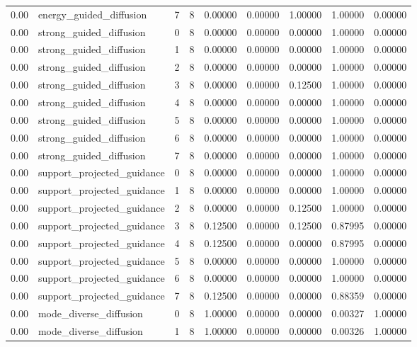 \documentclass{article}
\begin{document}
\begin{table}[tbp]
{\begin{tabular}{lllllllll}
0.00 & energy\_guided\_diffusion & 7 & 8 & 0.00000 & 0.00000 & 1.00000 & 1.00000 & 0.00000 \\
0.00 & strong\_guided\_diffusion & 0 & 8 & 0.00000 & 0.00000 & 0.00000 & 1.00000 & 0.00000 \\
0.00 & strong\_guided\_diffusion & 1 & 8 & 0.00000 & 0.00000 & 0.00000 & 1.00000 & 0.00000 \\
0.00 & strong\_guided\_diffusion & 2 & 8 & 0.00000 & 0.00000 & 0.00000 & 1.00000 & 0.00000 \\
0.00 & strong\_guided\_diffusion & 3 & 8 & 0.00000 & 0.00000 & 0.12500 & 1.00000 & 0.00000 \\
0.00 & strong\_guided\_diffusion & 4 & 8 & 0.00000 & 0.00000 & 0.00000 & 1.00000 & 0.00000 \\
0.00 & strong\_guided\_diffusion & 5 & 8 & 0.00000 & 0.00000 & 0.00000 & 1.00000 & 0.00000 \\
0.00 & strong\_guided\_diffusion & 6 & 8 & 0.00000 & 0.00000 & 0.00000 & 1.00000 & 0.00000 \\
0.00 & strong\_guided\_diffusion & 7 & 8 & 0.00000 & 0.00000 & 0.00000 & 1.00000 & 0.00000 \\
0.00 & support\_projected\_guidance & 0 & 8 & 0.00000 & 0.00000 & 0.00000 & 1.00000 & 0.00000 \\
0.00 & support\_projected\_guidance & 1 & 8 & 0.00000 & 0.00000 & 0.00000 & 1.00000 & 0.00000 \\
0.00 & support\_projected\_guidance & 2 & 8 & 0.00000 & 0.00000 & 0.12500 & 1.00000 & 0.00000 \\
0.00 & support\_projected\_guidance & 3 & 8 & 0.12500 & 0.00000 & 0.12500 & 0.87995 & 0.00000 \\
0.00 & support\_projected\_guidance & 4 & 8 & 0.12500 & 0.00000 & 0.00000 & 0.87995 & 0.00000 \\
0.00 & support\_projected\_guidance & 5 & 8 & 0.00000 & 0.00000 & 0.00000 & 1.00000 & 0.00000 \\
0.00 & support\_projected\_guidance & 6 & 8 & 0.00000 & 0.00000 & 0.00000 & 1.00000 & 0.00000 \\
0.00 & support\_projected\_guidance & 7 & 8 & 0.12500 & 0.00000 & 0.00000 & 0.88359 & 0.00000 \\
0.00 & mode\_diverse\_diffusion & 0 & 8 & 1.00000 & 0.00000 & 0.00000 & 0.00327 & 1.00000 \\
0.00 & mode\_diverse\_diffusion & 1 & 8 & 1.00000 & 0.00000 & 0.00000 & 0.00326 & 1.00000 \\
\bottomrule
\end{tabular}
}
\end{table}
\end{document}
